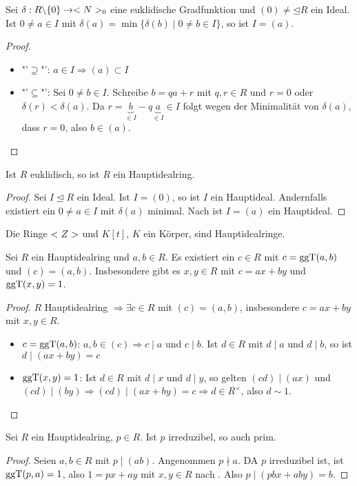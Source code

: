 \begin{lemma}
	Sei $\delta:R\backslash \{0\}\to <N>_0$ eine euklidische Gradfunktion und $(0)\neq\unlhd R$ ein Ideal. Ist $0\neq a\in I$ mit $\delta(a)=\min\{\delta(b)\mid 0\neq b\in I\}$, so ist $I=(a)$.
\end{lemma}
\begin{proof}
	\begin{itemize}
		\item "'$\supseteq$"': $a\in I\Rightarrow (a)\subset I$
		\item "'$\subseteq$"': Sei $0\neq b\in I$. Schreibe $b=qa+r$ mit $q,r\in R$ und $r=0$ oder $\delta(r)<\delta(a)$. Da $r=\underbrace{b}_{\in I}-q\underbrace{a}_{\in I}\in I$ folgt wegen der Minimalität von $\delta(a)$, dass $r=0$, also $b\in (a)$.
	\end{itemize}
\end{proof}

\begin{proposition}
	Ist $R$ euklidisch, so ist $R$ ein Hauptidealring.
\end{proposition}
\begin{proof}
	Sei $I\unlhd R$ ein Ideal. Ist $I=(0)$, so ist $I$ ein Hauptideal. Andernfalls existiert ein $0\neq a\in I$ mit $\delta(a)$ minimal. Nach  ist $I=(a)$ ein Hauptideal.
\end{proof}

\begin{conclusion}
	Die Ringe $<Z>$ und $K[t]$, $K$ ein Körper, sind Hauptidealringe.
\end{conclusion}

\begin{lemma}
	Sei $R$ ein Hauptidealring und $a,b\in R$. Es existiert ein $c\in R$ mit $c=\operatorname{ggT}(a,b)$ und $(c)=(a,b)$. Insbesondere gibt es $x,y\in R$ mit $c=ax+by$ und $\operatorname{ggT}(x,y)=1$.
\end{lemma}
\begin{proof}
	$R$ Hauptidealring $\Rightarrow\exists c\in R$ mit $(c)=(a,b)$, insbesondere $c=ax+by$ mit $x,y\in R$.
	\begin{itemize}
		\item $c=\operatorname{ggT}(a,b)$: $a,b\in (c)\Rightarrow c\mid a$ und $c\mid b$. Ist $d\in R$ mit $d\mid a$ und $d\mid b$, so ist $d\mid (ax+by)=c$
		\item $\operatorname{ggT}(x,y)=1$: Ist $d\in R$ mit $d\mid x$ und $d\mid y$, so gelten $(cd)\mid (ax)$ und $(cd)\mid (by)\Rightarrow (cd)\mid (ax+by)=c\Rightarrow d\in R^\times$, also $d\sim 1$.
	\end{itemize}
\end{proof}

\begin{proposition}
	Sei $R$ ein Hauptidealring, $p\in R$. Ist $p$ irreduzibel, so auch prim.
\end{proposition}
\begin{proof}
	Seien $a,b\in R$ mit $p\mid (ab)$. Angenommen $p\nmid a$. DA $p$ irreduzibel ist, ist $\operatorname{ggT}(p,a)=1$, also $1=px+ay$ mit $x,y\in R$ nach . Also $p\mid (pbx+aby)=b$.
\end{proof}